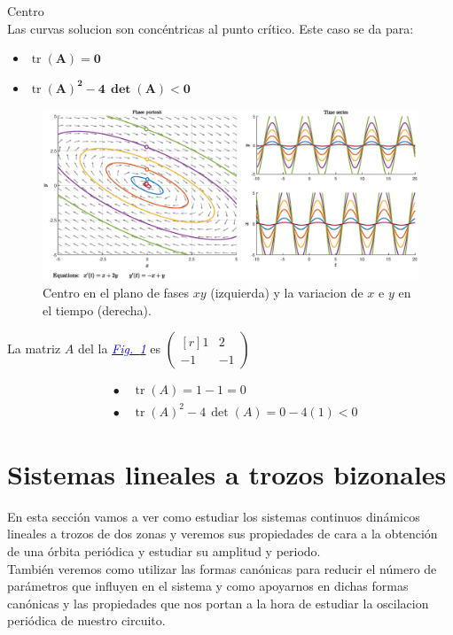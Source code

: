 \documentclass[12pt,a4paper]{report} %
\newcommand{\fref}[1]{\hyperref[#1]{\textcolor{blue}{\textit{Fig.~\ref*{#1}}}}}
\newcommand{\tr}{\operatorname{\textrm{tr}}}
\begin{document}
	\newpage
	
    {\Large\textbullet\quad Centro}\\[0.5cm]
    
    Las curvas solucion son concéntricas al punto crítico. Este caso se da para: 
    \begin{itemize}
    	\item \textbf{$\tr$}$\bm{(A)=0}$
    	\item \textbf{$\tr$}$\bm{(A)^2-4\, \det(A)<0}$
    \end{itemize}
    
    \begin{figure}[h]
    	\centering
    	\includegraphics[width=1\textwidth]{centro.eps}
    	\caption{Centro en el plano de fases $xy$ (izquierda) y la variacion de $x$ e $y$ en el tiempo (derecha).}
    	\label{fig:centro}
    \end{figure}\smallskip
    
    La matriz $A$ del la \fref{fig:centro} es 
    $\begin{pmatrix*}[r]
    	1 & 2 \\
    	-1 & -1
    \end{pmatrix*}$
    
    \begin{align*}
    	&\bullet\quad \tr(A)=1-1=0 \\[2mm]
    	&\bullet\quad \tr(A)^2-4\, \det(A)=0-4(1)<0
    \end{align*}
	
	\newpage
	\section{Sistemas lineales a trozos bizonales}
	\label{sistrobiz}
	En esta sección vamos a ver como estudiar los sistemas continuos dinámicos lineales a trozos de dos zonas y veremos sus propiedades de cara a la obtención de una órbita periódica y estudiar su amplitud y periodo.\\[0.5cm] También veremos como utilizar las formas canónicas para reducir el número de parámetros que influyen en el sistema y como apoyarnos en dichas formas canónicas y las propiedades que nos portan a la hora de estudiar la oscilacion periódica de nuestro circuito.
	
\end{document}
